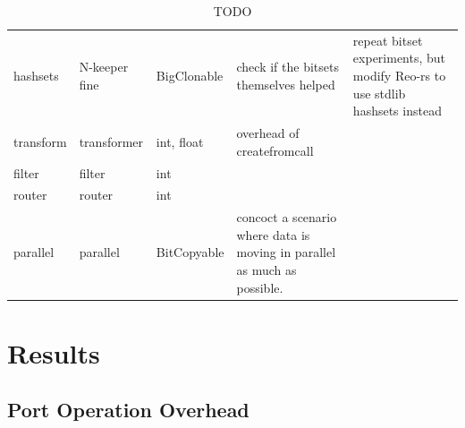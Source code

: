\begin{landscape}
\begin{table}[p!]
\begin{adjustbox}{width=19cm}
\begin{tabular}{l|ll|p{46mm}p{67mm}}
hashsets & N-keeper fine & BigClonable & check if the bitsets themselves helped & repeat bitset experiments, but modify Reo-rs to use stdlib hashsets instead \\

transform & transformer & int, float & overhead of createfromcall & \\

filter & filter & int & & \\

router & router & int & & \\

parallel & parallel & BitCopyable & concoct a scenario where data is moving in parallel as much as possible. & 

\end{tabular}
\end{adjustbox}
\caption[TODO]{TODO}	
\end{table}
\end{landscape}

\section{Results}

\subsection{Port Operation Overhead}

